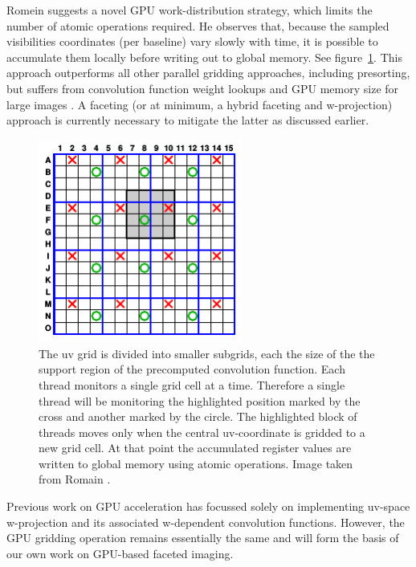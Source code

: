 \documentclass[a4paper, two column]{article}
\begin{document}
Romein \cite{romein2012efficient} suggests a novel GPU work-distribution strategy, which limits the number of atomic operations required. He observes that, because 
the sampled visibilities coordinates (per baseline) vary slowly with time, it is possible to accumulate them locally before writing out to global memory. See 
figure~\ref{IMG_WORK_DIST_STRATEGY}. This approach outperforms all other parallel gridding approaches, including presorting, but suffers from convolution function 
weight lookups and GPU memory size for large images \cite{muscat2014high}. A faceting (or at minimum, a hybrid faceting and w-projection) approach is currently 
necessary to mitigate the latter as discussed earlier.

\begin{figure}
 \begin{mdframed}
  \centering
  \includegraphics[width=0.6\textwidth]{work_dist_strategy.png}
  \caption{The uv grid is divided into smaller subgrids, each the size of the the support region of the precomputed convolution function. Each thread monitors a single
  grid cell at a time. Therefore a single thread will be monitoring the highlighted position marked by the cross and another marked by the circle. The highlighted block of 
  threads moves only when the central uv-coordinate is gridded to a new grid cell. At that point the accumulated register values are written to global memory using atomic 
  operations. Image taken from Romain \cite{romein2012efficient}.}
  \label{IMG_WORK_DIST_STRATEGY}
 \end{mdframed}
\end{figure}

Previous work on GPU acceleration has focussed solely on implementing uv-space w-projection and its associated w-dependent convolution functions. However, the GPU gridding 
operation remains essentially the same and will form the basis of our own work on GPU-based faceted imaging.
\end{document}
